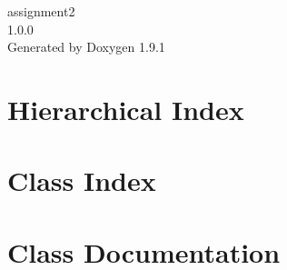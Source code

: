 \let\mypdfximage\pdfximage\def\pdfximage{\immediate\mypdfximage}\documentclass[twoside]{book}
\newcommand{\+}{\discretionary{\mbox{\scriptsize$\hookleftarrow$}}{}{}}
\newcommand{\clearemptydoublepage}{%
  \newpage{\pagestyle{empty}\cleardoublepage}%
}
\begin{document}
\raggedbottom

\hypersetup{pageanchor=false,
             bookmarksnumbered=true,
             pdfencoding=unicode
            }
\begin{titlepage}
\vspace*{7cm}
\begin{center}%
{\Large assignment2 \\[1ex]\large 1.\+0.\+0 }\\
\vspace*{1cm}
{\large Generated by Doxygen 1.9.1}\\
\end{center}
\end{titlepage}
\clearemptydoublepage
{}
\tableofcontents
\clearemptydoublepage
{}
\hypersetup{pageanchor=true}

\chapter{Hierarchical Index}

\chapter{Class Index}

\chapter{Class Documentation}


\backmatter
\newpage
{}
\clearemptydoublepage
{}
\printindex
\end{document}
